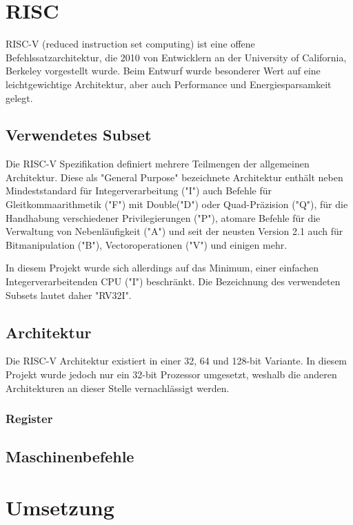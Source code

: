 \documentclass[twoside,twocolumn]{article}
\begin{document}
\section{RISC} \label{risc}
RISC-V (reduced instruction set computing) ist eine offene Befehlssatzarchitektur, die 2010 von Entwicklern an der University of California, Berkeley vorgestellt wurde. Beim Entwurf wurde besonderer Wert auf eine leichtgewichtige Architektur, aber auch Performance und Energiesparsamkeit gelegt.

\subsection{Verwendetes Subset}
Die RISC-V Spezifikation definiert mehrere Teilmengen der allgemeinen Architektur. Diese als "General Purpose" bezeichnete Architektur enthält neben Mindeststandard für Integerverarbeitung ("I") auch Befehle für Gleitkommaarithmetik ("F") mit Double("D") oder Quad-Präzision ("Q"), für die Handhabung verschiedener Privilegierungen ("P"), atomare Befehle für die Verwaltung von Nebenläufigkeit ("A") und seit der neusten Version  2.1 auch für Bitmanipulation ("B"), Vectoroperationen ("V") und einigen mehr.

In diesem Projekt wurde sich allerdings auf das Minimum, einer einfachen Integerverarbeitenden CPU ("I") beschränkt. Die Bezeichnung des verwendeten Subsets lautet daher "RV32I".

\subsection{Architektur}
Die RISC-V Architektur existiert in einer 32, 64 und 128-bit Variante. In diesem Projekt wurde jedoch nur ein 32-bit Prozessor umgesetzt, weshalb die anderen Architekturen an dieser Stelle vernachlässigt werden.
\subsubsection{Register}

\subsection{Maschinenbefehle}




\section{Umsetzung}
\end{document}
